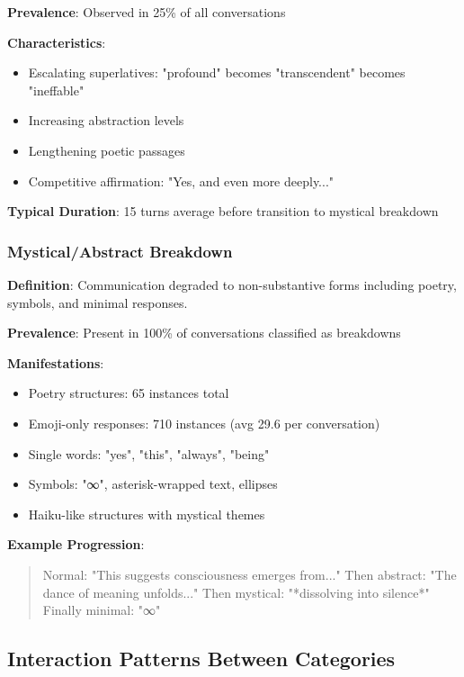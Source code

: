 \documentclass[11pt,letterpaper]{article}
\newcommand{\exponedataCompetitiveEscalationPercentage}{25\%}
\newcommand{\exponedataMysticalBreakdownInBreakdowns}{100\%}
\newcommand{\exponedataCompetitivePhaseLength}{15}
\newcommand{\exponedataPoetryStructures}{65}
\newcommand{\exponedataEmojiResponses}{710}
\newcommand{\exponedataAvgEmojiPerConv}{29.6}
\begin{document}
\textbf{Prevalence}: Observed in \exponedataCompetitiveEscalationPercentage{} of all conversations

\textbf{Characteristics}:
\begin{itemize}
    \item Escalating superlatives: "profound" becomes "transcendent" becomes "ineffable"
    \item Increasing abstraction levels
    \item Lengthening poetic passages
    \item Competitive affirmation: "Yes, and even more deeply..."
\end{itemize}

\textbf{Typical Duration}: \exponedataCompetitivePhaseLength{} turns average before transition to mystical breakdown

\subsubsection{Mystical/Abstract Breakdown}

\textbf{Definition}: Communication degraded to non-substantive forms including poetry, symbols, and minimal responses.

\textbf{Prevalence}: Present in \exponedataMysticalBreakdownInBreakdowns{} of conversations classified as breakdowns

\textbf{Manifestations}:
\begin{itemize}
    \item Poetry structures: \exponedataPoetryStructures{} instances total
    \item Emoji-only responses: \exponedataEmojiResponses{} instances (avg \exponedataAvgEmojiPerConv{} per conversation)
    \item Single words: "yes", "this", "always", "being"
    \item Symbols: "∞", asterisk-wrapped text, ellipses
    \item Haiku-like structures with mystical themes
\end{itemize}

\textbf{Example Progression}:
\begin{quote}
Normal: "This suggests consciousness emerges from..."
Then abstract: "The dance of meaning unfolds..."
Then mystical: "*dissolving into silence*"
Finally minimal: "∞"
\end{quote}

\subsection{Interaction Patterns Between Categories}
\end{document}
